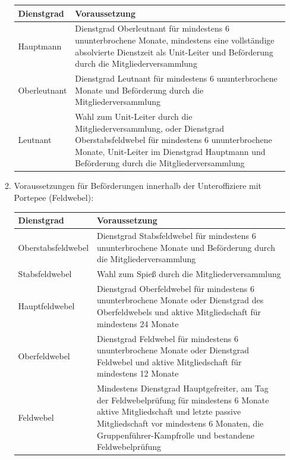 \begin{enumerate}[label=(\arabic*)]
\begin{enumerate}[label=(\Alph*)]
        \begin{center}
        \begin{tabular}{|p{4cm}|p{8cm}|}
        \hline
        \textbf{Dienstgrad} & \textbf{Voraussetzung} \\
        \hline
        Hauptmann & Dienstgrad Oberleutnant für mindestens 6 ununterbrochene Monate, mindestens eine vollständige absolvierte Dienstzeit als Unit-Leiter und Beförderung durch die Mitgliederversammlung \\
        \hline
        Oberleutnant & Dienstgrad Leutnant für mindestens 6 ununterbrochene Monate und Beförderung durch die Mitgliederversammlung \\
        \hline
        Leutnant & Wahl zum Unit-Leiter durch die Mitgliederversammlung, oder Dienstgrad Oberstabsfeldwebel für mindestens 6 ununterbrochene Monate, Unit-Leiter im Dienstgrad Hauptmann und Beförderung durch die Mitgliederversammlung \\
        \hline
        \end{tabular}
        \end{center}
	\newpage
        \item Voraussetzungen für Beförderungen innerhalb der Unteroffiziere mit Portepee (Feldwebel):
        \begin{center}
        \begin{tabular}{|p{4cm}|p{8cm}|}
        \hline
        \textbf{Dienstgrad} & \textbf{Voraussetzung} \\
        \hline
        Oberstabsfeldwebel & Dienstgrad Stabsfeldwebel für mindestens 6 ununterbrochene Monate und Beförderung durch die Mitgliederversammlung \\
        \hline
        Stabsfeldwebel & Wahl zum Spieß durch die Mitgliederversammlung \\
        \hline
        Hauptfeldwebel & Dienstgrad Oberfeldwebel für mindestens 6 ununterbrochene Monate oder Dienstgrad des Oberfeldwebels und aktive Mitgliedschaft für mindestens 24 Monate \\
        \hline
        Oberfeldwebel & Dienstgrad Feldwebel für mindestens 6 ununterbrochene Monate oder Dienstgrad Feldwebel und aktive Mitgliedschaft für mindestens 12 Monate \\
        \hline
        Feldwebel & Mindestens Dienstgrad Hauptgefreiter, am Tag der Feldwebelprüfung für mindestens 6 Monate aktive Mitgliedschaft und letzte passive Mitgliedschaft vor mindestens 6 Monaten, die Gruppenführer-Kampfrolle und bestandene Feldwebelprüfung \\

\end{tabular}
\end{center}
\end{enumerate}
\end{enumerate}
